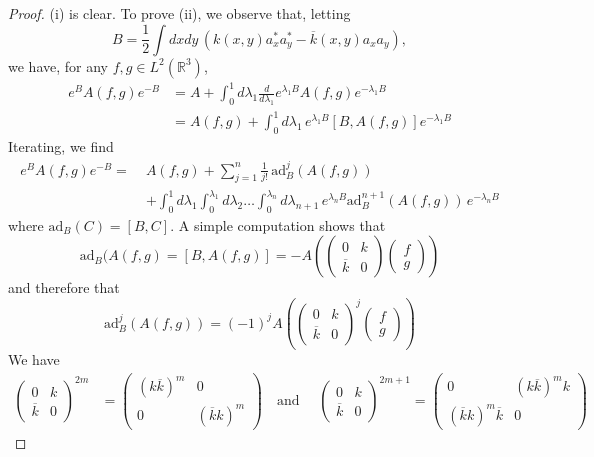 \documentclass[11pt,a4paper,DIV11]{scrartcl}	%
\newcommand{\bR}{{\mathbb R}}
\begin{document}
\begin{proof}
(i) is clear. To prove (ii), we observe that, letting 
\[  B = \frac{1}{2} \int dx dy \, \left(k(x,y) a_x^* a_y^* - \overline{k} (x,y) a_x a_y \right) , \]
we have, for any $f,g \in L^2 (\bR^3)$,  
\[ \begin{split} e^{B} A (f,g) e^{-B} & = A + \int_0^1 d \lambda_1  \frac{d}{d\lambda_1} e^{\lambda_1 B} A (f,g) e^{-\lambda_1 B}\\
& = A (f,g) + \int_0^1 d \lambda_1  \, e^{\lambda_1 B} [B,A (f,g)] e^{-\lambda_1 B}
 \end{split} \]
Iterating, we find
\begin{equation}\label{eq:baker} \begin{split} e^{B} A (f,g) e^{-B} = \; &A (f,g) + \sum_{j=1}^n \frac{1}{j!} \,\text{ad}_B^j (A (f,g)) \\ &+ \int_0^1 d\lambda_1 \int_0^{\lambda_1} d\lambda_2 \dots \int_0^{\lambda_{n}} d\lambda_{n+1} \, e^{\lambda_n B}  \text{ad}_B^{n+1} (A (f,g)) \, e^{-\lambda_n B}  \end{split}\end{equation}
where $\text{ad}_B (C) = [B,C]$. A simple computation shows that 
\[  \text{ad}_B (A (f,g) = [ B, A(f,g)] = - A \left(\left(  \begin{array}{ll}0 &  k  \\ \overline{k} & 0 \end{array} \right) \left( \begin{array}{l} f \\ g \end{array} \right) \right)  \]
and therefore that 
\[ \text{ad}^j_B (A (f,g)) = (-1)^j A  \left(\left(  \begin{array}{ll}0 &  k  \\ \overline{k} & 0 \end{array} \right)^j \left( \begin{array}{l} f \\ g \end{array} \right) \right) \]
We have 
\[ \begin{split} \left(  \begin{array}{ll}0 &  k  \\ \overline{k} & 0 \end{array} \right)^{2m} &= \left(  \begin{array}{ll} (k \overline{k})^m &  0 \\  0  & (\overline{k} k)^m  \end{array} \right)  \quad \text{and } \quad
\left(  \begin{array}{ll} 0 &  k  \\ \overline{k} & 0 \end{array} \right)^{2m+1} = \left(  \begin{array}{ll} 0 & (k \overline{k})^m k \\  (\overline{k} k)^m \overline{k} & 0 \end{array} \right) 

\end{split}\]
\end{proof}
\end{document}
